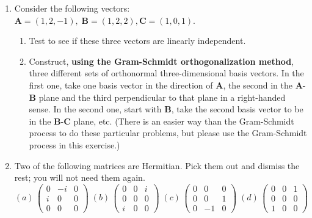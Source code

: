 \documentclass[fleqn]{article}
\begin{document}
\begin{enumerate}


  \item Consider the following vectors: $ \mathbf{A}=\left( 1,2,-1\right) \mathbf{,\;B}=\left( 1,2,2\right), \mathbf{C}=\left( 1,0,1\right)$.
  
    \begin{enumerate}
    \item Test to see if these three vectors are linearly independent.
  
    \item Construct, \textbf{using the Gram-Schmidt orthogonalization method}, three different sets of orthonormal three-dimensional basis vectors. In the first one, take one basis vector in the direction of $\mathbf{A}$, the second in the $\mathbf{A}$-$\mathbf{B}$ plane and the third perpendicular to that plane in a right-handed sense. In the second one, start with $\mathbf{B}$, take the second basis vector to be in the $\mathbf{B}$-$\mathbf{C}$ plane, etc. (There is an easier way than the Gram-Schmidt process to do these particular problems, but please use the Gram-Schmidt process in this exercise.)
    \end{enumerate}
  
  
  \item  Two of the following matrices are Hermitian. Pick them out and dismiss the rest; you will not need them again. 
    \[
    \left( a\right) \,\left( 
    \begin{array}{lll}
    0 & -i & 0 \\ 
    i & 0 & 0 \\ 
    0 & 0 & 0
    \end{array}
    \right) \;\left( b\right) \,\left( 
    \begin{array}{lll}
    0 & 0 & i \\ 
    0 & 0 & 0 \\ 
    i & 0 & 0
    \end{array}
    \right) \;\left( c\right) \,\left( 
    \begin{array}{lll}
    0 & 0 & 0 \\ 
    0 & 0 & 1 \\ 
    0 & -1 & 0
    \end{array}
    \right) \;\left( d\right) \,\left( 
    \begin{array}{lll}
    0 & 0 & 1 \\ 
    0 & 0 & 0 \\ 
    1 & 0 & 0
    \end{array}
    \right) 
    \]
  

\end{enumerate}
\end{document}
